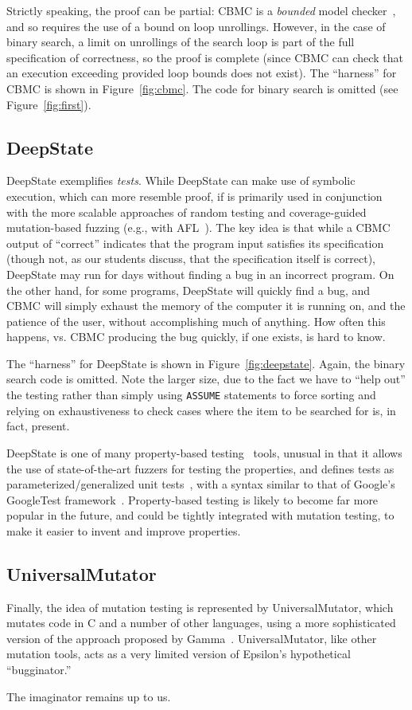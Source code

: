 \documentclass[sigplan]{acmart}
\begin{document}
Strictly speaking, the
proof can be partial: CBMC is a \emph{bounded} model checker~\cite{BMC}, and so
requires the use of a bound on loop unrollings.  However, in the case
of binary search, a limit on unrollings of the search loop is part of
the full specification of correctness, so the proof is complete (since
CBMC can check that an execution exceeding provided loop bounds does
not exist).  The ``harness'' for CBMC is shown in
Figure~\ref{fig:cbmc}.  The code for binary search is omitted (see
Figure~\ref{fig:first}).


\subsection{DeepState}

DeepState exemplifies \emph{tests}.  While DeepState can make use of
symbolic execution, which can more resemble proof, if is primarily
used in conjunction with the more scalable approaches of random
testing and coverage-guided mutation-based fuzzing (e.g., with AFL~\cite{aflfuzz}).  The key idea is that while a
CBMC output of ``correct'' indicates that the program input satisfies
its specification (though not, as our students discuss, that the
specification itself is correct), DeepState may run for days without
finding a bug in an incorrect program.  On the other hand, for some
programs, DeepState will quickly find a bug, and CBMC will simply
exhaust the memory of the computer it is running on, and the patience
of the user, without accomplishing much of anything.  How often this
happens, vs. CBMC producing the bug quickly, if one exists, is hard to
know.

The ``harness'' for DeepState is shown in Figure~\ref{fig:deepstate}.
Again, the binary search code is omitted.  Note the larger size, due to the fact we
have to ``help out'' the testing rather than simply using {\tt ASSUME}
statements to force sorting and relying on exhaustiveness to check cases
where the item to be searched for is, in fact, present.

DeepState is one of many property-based testing~\cite{ClaessenH00,goldstein2024property} tools, unusual in that
it allows the use of state-of-the-art fuzzers for testing the
properties, and defines tests as parameterized/generalized unit
tests~\cite{ParamUnit}, with a syntax similar to that of Google's
GoogleTest framework~\cite{GoogleTest}.  Property-based testing is
likely to become far more popular in the future, and could be tightly integrated
with mutation testing, to make it easier to invent and
improve properties.

\subsection{UniversalMutator}

Finally, the idea of mutation testing is represented by UniversalMutator, which mutates code
in C and a number of other languages, using a more sophisticated
version of the approach proposed by Gamma~\cite{SyntaxUM}.  UniversalMutator, like other
mutation tools, acts as a very limited version of Epsilon's
hypothetical 
``bugginator.''

The imaginator remains up to us.




\end{document}
